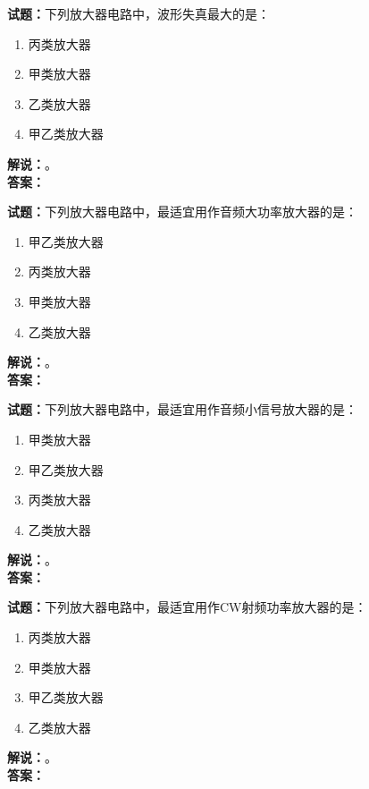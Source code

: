\documentclass{ctexbook}
\begin{document}
\bigskip




\noindent\textbf{试题：}下列放大器电路中，波形失真最大的是：
\begin{enumerate}[leftmargin=3em]
\item 丙类放大器
\item 甲类放大器
\item 乙类放大器
\item 甲乙类放大器
\end{enumerate}
\noindent\textbf{解说：}\textbf{}。\\\noindent\textbf{答案：}

\bigskip




\noindent\textbf{试题：}下列放大器电路中，最适宜用作音频大功率放大器的是：
\begin{enumerate}[leftmargin=3em]
\item 甲乙类放大器
\item 丙类放大器
\item 甲类放大器
\item 乙类放大器
\end{enumerate}
\noindent\textbf{解说：}\textbf{}。\\\noindent\textbf{答案：}

\bigskip




\noindent\textbf{试题：}下列放大器电路中，最适宜用作音频小信号放大器的是：
\begin{enumerate}[leftmargin=3em]
\item 甲类放大器
\item 甲乙类放大器
\item 丙类放大器
\item 乙类放大器
\end{enumerate}
\noindent\textbf{解说：}\textbf{}。\\\noindent\textbf{答案：}

\bigskip




\noindent\textbf{试题：}下列放大器电路中，最适宜用作CW射频功率放大器的是：
\begin{enumerate}[leftmargin=3em]
\item 丙类放大器
\item 甲类放大器
\item 甲乙类放大器
\item 乙类放大器
\end{enumerate}
\noindent\textbf{解说：}\textbf{}。\\\noindent\textbf{答案：}
\end{document}
